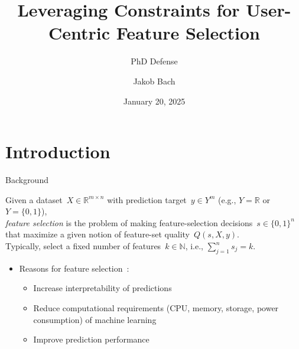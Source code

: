 \documentclass[en, navbarinline, handout]{sdqbeamer}
\title[Leveraging Constraints for User-Centric Feature Selection]{Leveraging Constraints for User-Centric Feature Selection} %
\subtitle{PhD Defense}
\author[Jakob Bach]{Jakob Bach} %
\date[2025-01-20]{January 20, 2025} %
\begin{document}
\KITtitleframe

\section{Introduction}

\begin{frame}[t]{Background}
	\begin{definition}
		\pause
		Given a dataset~$X \in \mathbb{R}^{m \times n}$
		with prediction target~$y \in Y^m$ (e.g., $Y = \mathbb{R}$ or $Y = \{0, 1\}$),\\
		\pause
		\emph{feature selection} is the problem of making feature-selection decisions~$s \in \{0,1\}^n$\\
		\pause
		that maximize a given notion of feature-set quality~$Q(s,X,y)$.\\
		\pause
		Typically, select a fixed number of features~$k \in \mathbb{N}$, i.e., $\sum_{j=1}^n s_j = k$.
	\end{definition}
	\pause
	\vspace{\baselineskip}
	\begin{itemize}
		\item Reasons for feature selection~\cite{chandrashekar2014survey, li2017feature}:
		\begin{itemize}
			\item Increase interpretability of predictions
			\item Reduce computational requirements (CPU, memory, storage, power consumption) of machine learning
			\item Improve prediction performance
		\end{itemize}
	\end{itemize}
\end{frame}
\end{document}
